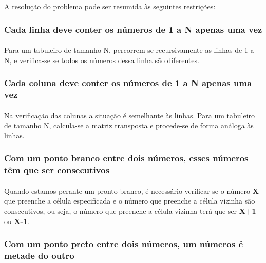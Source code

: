 \documentclass[runningheads,a4paper]{llncs}
\begin{document}
A resolução do problema pode ser resumida às seguintes restrições:

\subsubsection{Cada linha deve conter os números de 1 a N apenas uma vez}\paragraph{}

Para um tabuleiro de tamanho N, percorrem-se recursivamente as linhas de 1 a N, e verifica-se se todos os números dessa linha são diferentes.

\subsubsection{Cada coluna deve conter os números de 1 a N apenas uma vez}\paragraph{}

Na verificação das colunas a situação é semelhante às linhas. Para um tabuleiro de tamanho N, calcula-se a matriz transposta e procede-se de forma análoga às linhas. 

\subsubsection{Com um ponto branco entre dois números, esses números têm que ser consecutivos}\paragraph{}

Quando estamos perante um pronto branco, é necessário verificar se o número \textbf{X} que preenche a célula especificada e o número que preenche a célula vizinha são consecutivos, ou seja, o número que preenche a célula vizinha terá que ser \textbf{X+1} ou \textbf{X-1}.   

\subsubsection{Com um ponto preto entre dois números, um números é metade do outro}\paragraph{}
\end{document}
